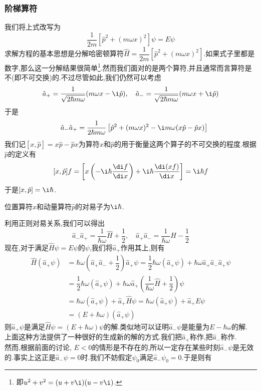 \documentclass{ctexart}
\begin{document}
\subsubsection{阶梯算符}
我们将上式改写为
\[\dfrac{1}{2m}\left[\hat{p}^2+(m\omega x)^2\right]\psi=E\psi\]
求解方程的基本思想是分解哈密顿算符$\hat{H}=\dfrac{1}{2m}\left[\hat{p}^2+(m\omega x)^2\right]$.如果式子里都是数字,那么这一分解结果很简单\footnote{即$u^2+v^2=(u+v\i)(u-v\i)$.}.然而我们面对的是两个算符,并且通常而言算符是不(即不可交换)的.不过尽管如此,我们仍然可以考虑
\[\hat{a}_{+}=\dfrac{1}{\sqrt{2\hbar m\omega}}(m\omega x-\i\hat{p}),\quad\hat{a}_{-}=\dfrac{1}{\sqrt{2\hbar m\omega}}(m\omega x+\i\hat{p})\]
于是
\[\quad\hat{a}_{-}\hat{a}_{+}=\dfrac{1}{2\hbar m\omega}\left[\hat{p}^2+(m\omega x)^2-\i m\omega(x\hat{p}-\hat{p}x)\right]\]
我们记$[x,\hat{p}]=x\hat{p}-\hat{p}x$为算符$x$和$\hat{p}$的用于衡量这两个算子的不可交换的程度.根据$\hat{p}$的定义有
\[[x,\hat{p}]f=\left[x\left(-\i\hbar\dfrac{\di f}{\di x}\right)+\i\hbar\dfrac{\di(xf)}{\di x}\right]=\i\hbar f\]
于是$[x,\hat{p}]=\i\hbar$.
\begin{theorem}[正则对易关系]
    位置算符$x$和动量算符$\hat{p}$的对易子为$\i\hbar$.
\end{theorem}
利用正则对易关系,我们可以得出
\[\hat{a}_{-}\hat{a}_{+}=\dfrac{1}{\hbar\omega}\hat{H}+\dfrac12,\quad\hat{a}_{+}\hat{a}_{-}=\dfrac{1}{\hbar\omega}\hat{H}-\dfrac12\]
现在,对于满足$\hat{H}\psi=E\psi$的$\psi$,我们将$\hat{a}_+$作用其上,则有
\[\begin{aligned}
    \hat{H}(\hat{a}_+\psi)
    &=\hbar\omega\left(\hat{a}_+\hat{a}_-+\dfrac12\right)\hat{a}_+\psi=\dfrac12\hbar\omega(\hat{a}_+\psi)+\hbar\omega\hat{a}_+\hat{a}_-\hat{a}_+\psi\\
    &=\dfrac12\hbar\omega(\hat{a}_+\psi)+\hbar\omega\hat{a}_+\left(\dfrac{1}{\hbar\omega}\hat{H}+\dfrac12\right)\psi\\
    &=\hbar\omega(\hat{a}_+\psi)+\hat{a}_+\hat{H}\psi=\hbar\omega(\hat{a}_+\psi)+\hat{a}_+E\psi\\
    &=(E+\hbar\omega)(\hat{a}_+\psi)
\end{aligned}\]
则$\hat{a}_+\psi$是满足$\hat{H}\psi=\left(E+\hbar\omega\right)\psi$的解.类似地可以证明$\hat{a}_-\psi$是能量为$E-\hbar\omega$的解.\\
\indent 上面这种方法提供了一种很好的生成新的解的方式.我们把$\hat{a}_+$称作,把$\hat{a}_-$称作.\\
\indent 然而,根据前面的讨论, $E<0$的情形是不存在的,所以一定存在某些时刻$\hat{a}_-\psi$是无效的.事实上这正是$\hat{a}_-\psi=0$时.我们不妨假定$\psi_0$满足$\hat{a}_-\psi_0=0$.于是则有
\end{document}
